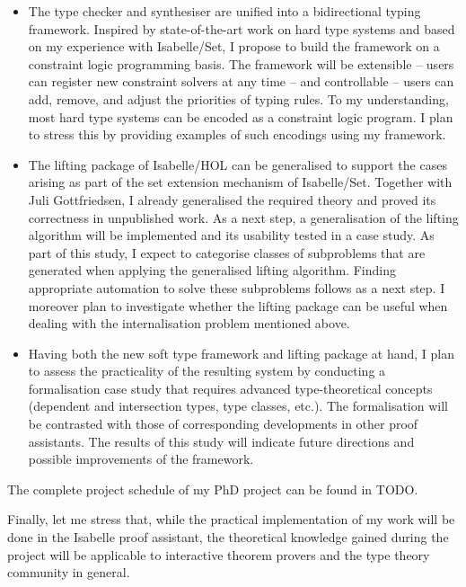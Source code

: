 \documentclass[a4paper, 12pt]{article}
\theoremstyle{plain}
\theoremstyle{definition}
\begin{document}
\begin{itemize}
  \item The type checker and synthesiser are unified into a bidirectional typing framework.
    Inspired by state-of-the-art work on hard type systems
    \cite{de2015elaboration,guidi2019implementing,mazzoli2016type,tassi2012bi,vytiniotis2011outsidein}
    and based on my experience with Isabelle/Set,
    I propose to build the framework on a constraint logic programming basis.
    The framework will be extensible -- users can register new constraint solvers at any time --
    and controllable -- users can add, remove, and adjust the priorities of typing rules.
    To my understanding,
    most hard type systems can be encoded as a constraint logic program.
    I plan to stress this by providing examples of such encodings using my framework.
  \item The lifting package of Isabelle/HOL can be generalised to support the cases arising as part of the set extension mechanism of Isabelle/Set.
    Together with Juli Gottfriedsen,
    I already generalised the required theory and proved its correctness in unpublished work.
    As a next step,
    a generalisation of the lifting algorithm will be implemented and its
    usability tested in a case study.
    As part of this study,
    I expect to categorise classes of subproblems that are generated when applying the generalised lifting algorithm.
    Finding appropriate automation to solve these subproblems follows as a next step.
    I moreover plan to investigate whether the lifting package can be useful when dealing with the internalisation problem mentioned above.
  \item Having both the new soft type framework and lifting package at hand,
    I plan to assess the practicality of the resulting system
    by conducting a formalisation case study that
    requires advanced type-theoretical concepts (dependent and intersection types, type classes, etc.).
    The formalisation will be contrasted with those of corresponding developments in other proof assistants.
    The results of this study will indicate future directions and possible improvements of the framework.
\end{itemize}
The complete project schedule of my PhD project can be found in TODO.

Finally, let me stress that,
while the practical implementation of my work will be done in the Isabelle proof assistant,
the theoretical knowledge gained during the project will be applicable to interactive theorem provers and the type theory community in general.

\newpage


\end{document}
